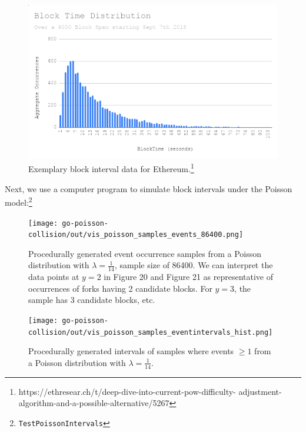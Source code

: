 \documentclass[11pt]{article}
\theoremstyle{plain}
\begin{document}
\begin{figure}[tph]
    \centering

\includegraphics[width=1.0\textwidth]{vis_data_blockinterval_distribution.png}
    \caption{
      Exemplary block interval data for
Ethereum.\footnote{https://ethresear.ch/t/deep-dive-into-current-pow-difficulty-
adjustment-algorithm-and-a-possible-alternative/5267}
    }
\end{figure}

Next, we use a computer program to simulate block intervals under the Poisson
model:\footnote{\texttt{TestPoissonIntervals}}

\begin{figure}[tph]
    \label{vis_poisson_samples_events_86400}
    \centering
    \texttt{[image: go-poisson-collision/out/vis\_poisson\_samples\_events\_86400.png]}
    \caption{
        Procedurally generated event occurrence samples from a Poisson distribution
        with $\lambda = \frac{1}{14}$, sample size of 86400.
        We can interpret the data points at $y=2$ in Figure 20 and Figure 21 as
        representative of occurrences of forks having 2 candidate blocks.
        For $y=3$, the sample has 3 candidate blocks, etc.
    }
\end{figure}

\begin{figure}[tph]
    \label{vis_poisson_samples_eventintervals_hist}
    \centering
\texttt{[image: go-poisson-collision/out/vis\_poisson\_samples\_eventintervals\_hist.png]}
    \caption{
      Procedurally generated intervals of samples where events $\geq 1$ from
        a Poisson distribution with $\lambda = \frac{1}{14}$.
    }
\end{figure}

\end{document}
